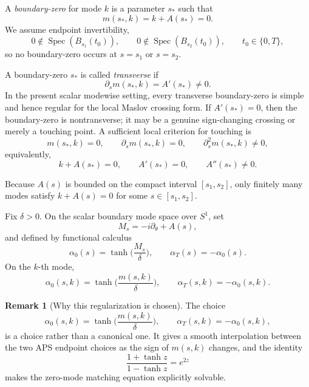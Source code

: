 \documentclass[11pt]{article}
\theoremstyle{definition}
\newtheorem{remark}[remark]{Remark}
\DeclareMathOperator{\Spec}{Spec}
\numberwithin{equation}{section}
\begin{document}
A \emph{boundary-zero} for mode \(k\) is a parameter \(s_*\) such that
\begin{equation}\label{eq:mass-root}
m(s_*,k)=k+A(s_*)=0.
\end{equation}
We assume endpoint invertibility,
\begin{equation}
0\notin\Spec(B_{s_1}(t_0)),
\qquad
0\notin\Spec(B_{s_2}(t_0)),
\qquad t_0\in\{0,T\},
\end{equation}
so no boundary-zero occurs at \(s=s_1\) or \(s=s_2\).

A boundary-zero \(s_*\) is called \emph{transverse} if
\begin{equation}
\partial_s m(s_*,k)=A'(s_*)\neq 0.
\end{equation}
In the present scalar modewise setting, every transverse boundary-zero is simple and hence regular for the local Maslov crossing form. If \(A'(s_*)=0\), then the boundary-zero is nontransverse; it may be a genuine sign-changing crossing or merely a touching point. A sufficient local criterion for touching is
\begin{equation}
m(s_*,k)=0,\qquad \partial_s m(s_*,k)=0,\qquad \partial_s^2 m(s_*,k)\neq 0,
\end{equation}
equivalently,
\begin{equation}
k+A(s_*)=0,\qquad A'(s_*)=0,\qquad A''(s_*)\neq 0.
\end{equation}

Because \(A(s)\) is bounded on the compact interval \([s_1,s_2]\), only finitely many modes satisfy \(k+A(s)=0\) for some \(s\in[s_1,s_2]\).

Fix \(\delta>0\). On the scalar boundary mode space over \(S^1\), set
\begin{equation}
M_s=-i\partial_\theta+A(s),
\end{equation}
and defined by functional calculus
\begin{equation}\label{eq:alpha-global}
\alpha_0(s)=\tanh\!\Big(\frac{M_s}{\delta}\Big),
\qquad
\alpha_T(s)=-\alpha_0(s).
\end{equation}
On the \(k\)-th mode,
\begin{equation}\label{eq:alpha_def_clean}
\alpha_0(s,k)=\tanh\!\Big(\frac{m(s,k)}{\delta}\Big),
\qquad
\alpha_T(s,k)=-\alpha_0(s,k).
\end{equation}

\begin{remark}[Why this regularization is chosen]
The choice
\begin{equation}
\alpha_0(s,k)=\tanh\!\Big(\frac{m(s,k)}{\delta}\Big),
\qquad
\alpha_T(s,k)=-\alpha_0(s,k),
\end{equation}
is a choice rather than a canonical one. It gives a smooth interpolation between the two APS endpoint choices as the sign of \(m(s,k)\) changes, and the identity
\begin{equation}
\frac{1+\tanh z}{1-\tanh z}=e^{2z}
\end{equation}
makes the zero-mode matching equation explicitly solvable.
\end{remark}
\end{document}
